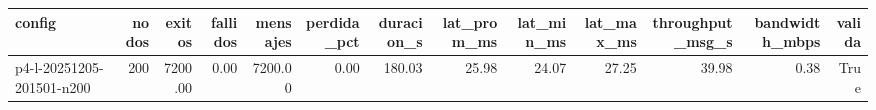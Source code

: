 \begin{tabular}{lrrrrrrrrrrrr}
\toprule
config & nodos & exitos & fallidos & mensajes & perdida_pct & duracion_s & lat_prom_ms & lat_min_ms & lat_max_ms & throughput_msg_s & bandwidth_mbps & valida \\
\midrule
p4-l-20251205-201501-n200 & 200 & 7200.00 & 0.00 & 7200.00 & 0.00 & 180.03 & 25.98 & 24.07 & 27.25 & 39.98 & 0.38 & True \\
\bottomrule
\end{tabular}
